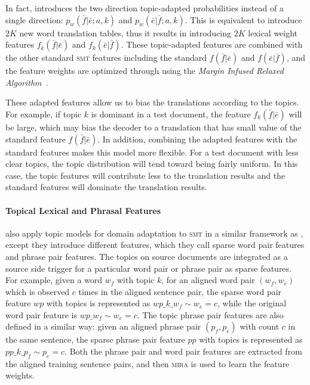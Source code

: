 In fact, \citet{Eidelman-12} introduces the two direction
topic-adapted probabilities instead of a single direction:
$p_w(\bar{f} | \bar{e};a, k)$ and $p_w(\bar{e} | \bar{f};a, k)$. This
is equivalent to introduce $2K$ new word translation tables, thus it
results in introducing $2K$ lexical weight features
$f_{k}(\bar{f}|\bar{e})$ and $f_{k}(\bar{e}|\bar{f})$. These
topic-adapted features are combined with the other standard
\textsc{smt} features including the standard $f(\bar{f}|\bar{e})$ and
$f(\bar{e}|\bar{f})$, and the feature weights are optimized through
using the \emph{Margin Infused Relaxed
  Algorithm}~\cite[\textsc{mira}]{Crammer-06}.

These adapted features allow us to bias the translations according to
the topics. For example, if topic $k$ is dominant in a test document,
the feature $f_k(\bar{f} | \bar{e})$ will be large, which may bias the
decoder to a translation that has small value of the standard feature
$f(\bar{f}|\bar{e})$. In addition, combining the adapted features with
the standard features makes this model more flexible. For a test
document with less clear topics, the topic distribution will tend
toward being fairly uniform. In this case, the topic features will
contribute less to the translation results and the standard features
will dominate the translation results.

\paragraph{Topical Lexical and Phrasal Features}

\citet{hasler-12} also apply topic models for domain adaptation to
\textsc{smt} in a similar framework as \citet{Eidelman-12}, except
they introduce different features, which they call sparse word pair
features and phrase pair features. The topics on source documents are
integrated as a source side trigger for a particular word pair or
phrase pair as sparse features. For example, given a word $w_f$ with
topic $k$, for an aligned word pair $(w_f, w_e)$ which is observed $c$
times in the aligned sentence pair, the sparse word pair feature $wp$
with topics is represented as $wp\_k\_w_f \sim w_e = c$, while the
original word pair feature is $wp\_w_f \sim w_e = c$. The topic phrase
pair features are also defined in a similar way: given an aligned
phrase pair $(p_f, p_e)$ with count $c$ in the same sentence, the
sparse phrase pair feature $pp$ with topics is represented as
$pp\_k\_p_f \sim p_e = c$. Both the phrase pair and word pair features
are extracted from the aligned training sentence pairs, and then
\textsc{mira} is used to learn the feature weights.

